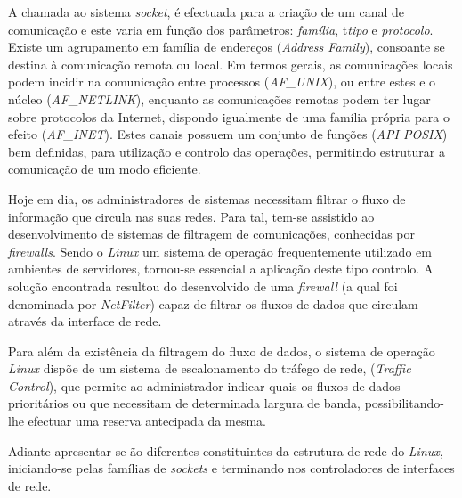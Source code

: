 A chamada ao sistema \textit{socket}, é efectuada para a criação de um canal de comunicação e este varia em função dos parâmetros: \textit{família}, t\textit{tipo} e \textit{protocolo}.
Existe um agrupamento em família de endereços (\textit{Address Family}), consoante se destina à comunicação remota ou local.
Em termos gerais, as comunicações locais podem incidir na comunicação entre processos (\textit{AF\_UNIX}), ou entre estes e o núcleo (\textit{AF\_NETLINK}), enquanto as comunicações remotas podem ter lugar sobre protocolos da Internet, dispondo igualmente de uma família própria para o efeito (\textit{AF\_INET}).
Estes canais possuem um conjunto de funções (\textit{API POSIX}) bem definidas, para utilização e controlo das operações, permitindo estruturar a comunicação de um modo eficiente.



Hoje em dia, os administradores de sistemas necessitam filtrar o fluxo de informação que circula nas suas redes.
Para tal, tem-se assistido ao desenvolvimento de sistemas de filtragem de comunicações, conhecidas por \textit{firewalls}.
Sendo o \textit{Linux} um sistema de operação frequentemente utilizado em ambientes de servidores, tornou-se essencial a aplicação deste tipo controlo.
A solução encontrada resultou do desenvolvido de uma \textit{firewall} (a qual foi denominada por \textit{NetFilter}) capaz de filtrar os fluxos de dados que circulam através da interface de rede.

Para além da existência da filtragem do fluxo de dados, o sistema de operação \textit{Linux} dispõe de um sistema de escalonamento do tráfego de rede, (\textit{Traffic Control}), que permite ao administrador indicar quais os fluxos de dados prioritários ou que necessitam de determinada largura de banda, possibilitando-lhe efectuar uma reserva antecipada da mesma.
 
Adiante apresentar-se-ão diferentes constituintes da estrutura de rede do \textit{Linux}, iniciando-se pelas famílias de \textit{sockets} e terminando nos controladores de interfaces de rede.

